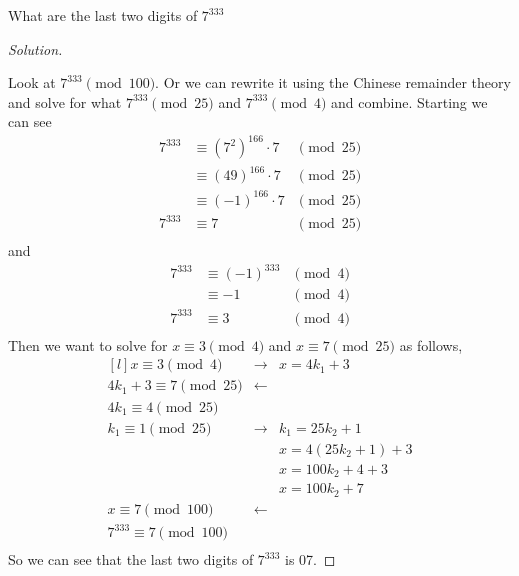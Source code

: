 \documentclass[11pt]{article}
\newenvironment{problem}[2][Problem]{\begin{trivlist}
\item[\hskip \labelsep {\bfseries #1}\hskip \labelsep {\bfseries #2.}]}{\end{trivlist}}
\newenvironment{solution}
  {\renewcommand\qedsymbol{$~$}\begin{proof}[Solution]$ $\par\nobreak\ignorespaces}
  {\end{proof}}
\begin{document}
\begin{problem}{4}
What are the last two digits of $7^{333}$
\end{problem}

\begin{solution}
    Look at $7^{333}\pmod{100}$. Or we can rewrite it using the Chinese remainder theory and solve for what $7^{333}\pmod{25}$ and $7^{333}\pmod{4}$ and combine. Starting we can see
    \[
        \begin{array}{rlc}
            7^{333} & \equiv \left(7^2\right)^{166} \cdot 7 & \pmod{25} \\
                    & \equiv \left(49 \right)^{166} \cdot 7 & \pmod{25} \\
                    & \equiv \left(-1 \right)^{166} \cdot 7 & \pmod{25} \\
            7^{333} & \equiv 7                              & \pmod{25} \\
        \end{array}
    \]
    and
    \[
        \begin{array}{rlc}
            7^{333} & \equiv (-1)^{333} & \pmod{4} \\
                    & \equiv -1         & \pmod{4} \\
            7^{333} & \equiv 3          & \pmod{4} \\
        \end{array}
    \]
    Then we want to solve for $x\equiv 3 \pmod{4}$ and $x\equiv 7\pmod{25}$ as follows,
    \[
        \begin{matrix*}[l]
            x \equiv 3 \pmod{4} &\rightarrow & x=4k_1 +3 \\
            4k_1 + 3 \equiv 7 \pmod{25} &\leftarrow & \\
            4k_1 \equiv 4 \pmod{25} && \\
            k_1 \equiv 1 \pmod{25} & \rightarrow &k_1 = 25k_2 +1\\
            && x=4(25k_2+1) + 3 \\
            && x= 100k_2 +4 + 3 \\
            && x= 100k_2 + 7 \\
            x \equiv 7 \pmod{100} &\leftarrow& \\
            7^{333} \equiv 7 \pmod{100} && \\
        \end{matrix*}
    \]
    So we can see that the last two digits of $7^{333}$ is 07.
\end{solution}
\end{document}
